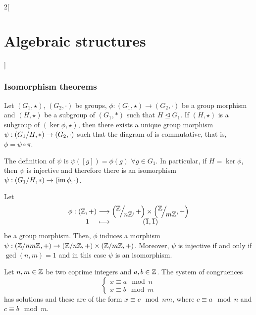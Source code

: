 \documentclass[../../../main_math.tex]{subfiles}
\begin{document}
\begin{multicols}{2}[\section{Algebraic structures}]
  \subsubsection{Isomorphism theorems}
  \begin{theorem}
    Let $(G_1,\star)$, $(G_2,\cdot)$ be groups, $\phi:(G_1,\star)\rightarrow (G_2,\cdot)$ be a group morphism and $(H,\star)$ be a subgroup of $(G_1,*)$ such that $H\unlhd G_1$. If $(H,\star)$ is a subgroup of $(\ker\phi,\star)$, then there exists a unique group morphism $\psi:(\quot{G_1}{H},*)\rightarrow (G_2,\cdot)$ such that the diagram of  is commutative, that is, $\phi=\psi\circ\pi$.
    \begin{center}
      \begin{minipage}{\linewidth}
        \centering
        
        \label{AS:theorem1}
      \end{minipage}
    \end{center}
    The definition of $\psi$ is $\psi([g])=\phi(g)$ $\forall g\in G_1$.
    In particular, if $H=\ker\phi$, then $\psi$ is injective and therefore there is an isomorphism $\psi:(\quot{G_1}{H},*)\rightarrow (\im\phi,\cdot)$.
  \end{theorem}
  \begin{theorem}
    Let
    \begin{equation*}
      \function{\phi}{(\ZZ,+)}{\displaystyle\left(\quot{\ZZ }{n\ZZ },+\right)\times\left(\quot{\ZZ }{m\ZZ },+\right)}{1}{(\overline{1},\overline{1})}
    \end{equation*}
    be a group morphism. Then, $\phi$ induces a morphism $\psi:(\mathbb{Z} /nm\mathbb{Z},+) \rightarrow(\mathbb{Z} /n\mathbb{Z},+) \times(\mathbb{Z} /m\mathbb{Z},+) $. Moreover, $\psi$ is injective if and only if $\gcd(n,m)=1$ and in this case $\psi$ is an isomorphism.
  \end{theorem}
  \begin{corollary}
    Let $n,m\in\mathbb{Z} $ be two coprime integers and $a,b\in\mathbb{Z} $. The system of congruences $$
      \begin{cases}
        x\equiv a\mod{n} \\
        x\equiv b\mod{m}
      \end{cases}$$ has solutions and these are of the form $x\equiv c\mod{nm}$, where $c\equiv a\mod{n}$ and $c\equiv b\mod{m}$.
  \end{corollary}
  \begin{definition}

\end{definition}
\end{multicols}
\end{document}
